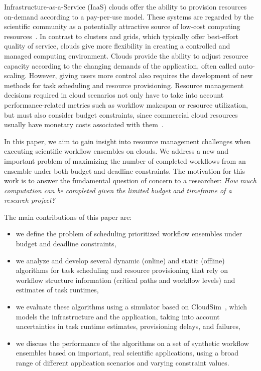 \documentclass[preprint,5p]{elsarticle}
\begin{document}
Infrastructure-as-a-Service (IaaS) clouds offer the ability to provision 
resources on-demand according to a pay-per-use model. These systems 
are regarded by the scientific community as a potentially attractive source of 
low-cost computing resources~\cite{Ostermann2010, Keahey2009}. In contrast 
to clusters and grids, which typically offer best-effort quality of service, clouds 
give more flexibility in creating a controlled and managed computing environment.
Clouds provide the ability to adjust resource capacity according to the changing
demands of the application, often called auto-scaling. However, giving users 
more control also requires the development of new methods for task 
scheduling and resource provisioning. Resource management decisions required 
in cloud scenarios not only have to take into account performance-related 
metrics such as workflow makespan or resource utilization, but must also consider
budget constraints, since commercial cloud resources
usually have monetary costs associated with them~\cite{Durkee2010}.

In this paper, we aim to gain insight into resource management challenges when
executing scientific workflow ensembles on clouds. We address a
new and important problem of maximizing the number of completed workflows from
an ensemble under both budget and deadline constraints. The motivation for this
work is to answer the fundamental question of concern to a researcher: {\em How much
computation can be completed given the limited budget and timeframe of a
research project?} 

The main contributions of this paper are:
\begin{itemize}
  \item we define the problem of scheduling prioritized workflow ensembles
  under budget and deadline constraints,
  \item we analyze and develop several dynamic (online) and static (offline) 
  algorithms for task scheduling and resource provisioning that rely on workflow 
  structure information (critical paths and workflow levels) and estimates of 
  task runtimes,
  \item we evaluate these algorithms using a simulator based on 
  CloudSim~\cite{Calheiros2011}, which models the infrastructure and the 
  application, taking into account uncertainties in task runtime estimates, 
  provisioning delays, and failures, 
  \item we discuss the performance of the algorithms on a set of
  synthetic workflow ensembles based on important, real scientific
  applications, using a broad range of different application scenarios and
  varying constraint values.
\end{itemize}
\end{document}
